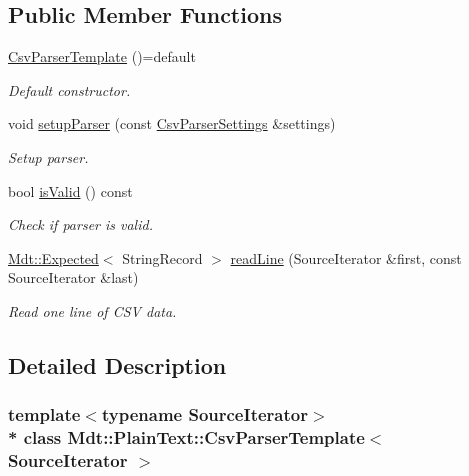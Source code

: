 \subsection*{Public Member Functions}
\begin{DoxyCompactItemize}
\item 
\hyperlink{class_mdt_1_1_plain_text_1_1_csv_parser_template_a0365862918b7ffb5e70bfd2fd6a0e95e}{Csv\+Parser\+Template} ()=default
\begin{DoxyCompactList}\small\item\em Default constructor. \end{DoxyCompactList}\item 
void \hyperlink{class_mdt_1_1_plain_text_1_1_csv_parser_template_a95c35ee9721efec0aedcf8b18b310001}{setup\+Parser} (const \hyperlink{class_mdt_1_1_plain_text_1_1_csv_parser_settings}{Csv\+Parser\+Settings} \&settings)
\begin{DoxyCompactList}\small\item\em Setup parser. \end{DoxyCompactList}\item 
bool \hyperlink{class_mdt_1_1_plain_text_1_1_csv_parser_template_a215191b75041f462135572f328669731}{is\+Valid} () const 
\begin{DoxyCompactList}\small\item\em Check if parser is valid. \end{DoxyCompactList}\item 
\hyperlink{class_mdt_1_1_expected}{Mdt\+::\+Expected}$<$ String\+Record $>$ \hyperlink{class_mdt_1_1_plain_text_1_1_csv_parser_template_aa6a88c11fa8def4ee7fd3437d9099a95}{read\+Line} (Source\+Iterator \&first, const Source\+Iterator \&last)
\begin{DoxyCompactList}\small\item\em Read one line of C\+SV data. \end{DoxyCompactList}\end{DoxyCompactItemize}


\subsection{Detailed Description}
\subsubsection*{template$<$typename Source\+Iterator$>$\\*
class Mdt\+::\+Plain\+Text\+::\+Csv\+Parser\+Template$<$ Source\+Iterator $>$}

